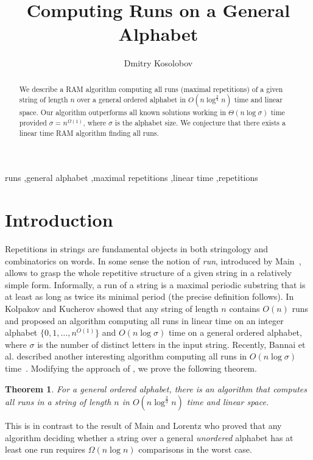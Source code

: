 \documentclass[3p,twocolumn]{elsarticle}
\theoremstyle{plain}
\newtheorem*{theorem}{Theorem}
\theoremstyle{definition}
\begin{document}
\begin{frontmatter}

\title{Computing Runs on a General Alphabet}

\author{Dmitry Kosolobov} \address{Ural Federal University, Ekaterinburg, Russia}

\begin{abstract}
We describe a RAM algorithm computing all runs (maximal repetitions) of a given string of length $n$ over a general ordered alphabet in $O(n\log^{\frac{2}3} n)$ time and linear space. Our algorithm outperforms all known solutions working in $\Theta(n\log\sigma)$ time provided $\sigma = n^{\Omega(1)}$, where $\sigma$ is the alphabet size. We conjecture that there exists a linear time RAM algorithm finding all runs.
\end{abstract}


\begin{keyword}
runs \sep general alphabet \sep maximal repetitions \sep linear time \sep  repetitions
\end{keyword}

\end{frontmatter}


\section{Introduction}

Repetitions in strings are fundamental objects in both stringology and combinatorics on words. In some sense the notion of \emph{run}, introduced by Main~\cite{Main}, allows to grasp the whole repetitive structure of a given string in a relatively simple form. Informally, a run of a string is a maximal periodic substring that is at least as long as twice its minimal period (the precise definition follows). In~\cite{KolpakovKucherov} Kolpakov and Kucherov showed that any string of length $n$ contains $O(n)$ runs and proposed an algorithm computing all runs in linear time on an integer alphabet $\{0,1,\ldots, n^{O(1)}\}$ and $O(n\log\sigma)$ time on a general ordered alphabet, where $\sigma$ is the number of distinct letters in the input string. Recently, Bannai et al. described another interesting algorithm computing all runs in $O(n\log\sigma)$ time~\cite{BannaiIInenagaNakashimaTakedaTsuruta}. Modifying the approach of \cite{BannaiIInenagaNakashimaTakedaTsuruta}, we prove the following theorem.
\begin{theorem}
For a general ordered alphabet, there is an algorithm that computes all runs in a string of length $n$ in $O(n\log^{\frac{2}{3}} n)$ time and linear space.
\end{theorem}
This is in contrast to the result of Main and Lorentz \cite{MainLorentz} who proved that any algorithm deciding whether a string over a general \emph{unordered} alphabet has at least one run requires $\Omega(n\log n)$ comparisons in the worst case.
\end{document}
